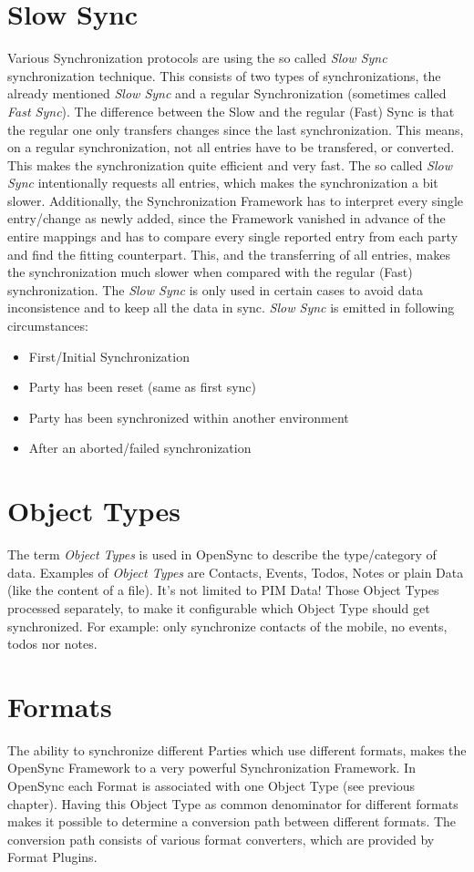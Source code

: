 \section{Slow Sync}
Various Synchronization protocols are using the so called \emph{Slow Sync}
synchronization technique. This consists of two types of synchronizations, the
already mentioned \emph{Slow Sync} and a regular Synchronization (sometimes called
\emph{Fast Sync}). The difference between the Slow and the regular (Fast) Sync is 
that the regular one only transfers changes since the last synchronization. 
This means, on a regular synchronization, not all entries have to be transfered, or
converted. This makes the synchronization quite efficient and very fast. The
so called \emph{Slow Sync} intentionally requests all entries, which makes the
synchronization a bit slower. Additionally, the Synchronization Framework has to
interpret every single entry/change as newly added, since the Framework vanished
in advance of the entire mappings and has to compare every single reported entry
from each party and find the fitting counterpart. This, and the transferring of 
all entries, makes the synchronization much slower when compared with the regular 
(Fast) synchronization. The \emph{Slow Sync} is only used in certain
cases to avoid data inconsistence and to keep all the data in sync. \emph{Slow
Sync} is emitted in following circumstances:
\begin{itemize}
\item First/Initial Synchronization
\item Party has been reset (same as first sync)
\item Party has been synchronized within another environment
\item After an aborted/failed synchronization
\end{itemize}

\section{Object Types}
The term \emph{Object Types} is used in OpenSync to describe the type/category of 
data. Examples of \emph{Object Types} are Contacts, Events, Todos, Notes or plain 
Data (like the content of a file). It's not limited to PIM Data! 
Those Object Types processed separately, to make it configurable which 
Object Type should get synchronized. For example: only synchronize contacts of the 
mobile, no events, todos nor notes.

\section{Formats}
The ability to synchronize different Parties which use different formats, makes
the OpenSync Framework to a very powerful Synchronization Framework. In OpenSync
each Format is associated with one Object Type (see previous chapter). Having this
Object Type as common denominator for different formats makes it possible to
determine a conversion path between different formats. The conversion path
consists of various format converters, which are provided by Format Plugins.

